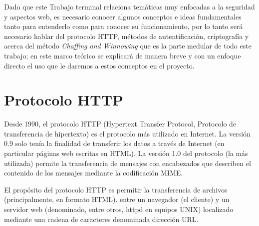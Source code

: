 \documentclass[12pt, a4paper, titlepage]{report}
\begin{document}
	        Dado que este Trabajo terminal relaciona temáticas muy enfocadas a la seguridad y aspectos web, es necesario conocer algunos conceptos e ideas fundamentales tanto para entenderlo como para conocer su funcionamiento, por lo tanto será necesario hablar del protocolo HTTP, métodos de autentificación, criptografía y acerca del método \textit{Chaffing and Winnowing} que es la parte medular de todo este trabajo; en este marco teórico se explicará de manera breve y con un enfoque directo el uso que le daremos a estos conceptos en el proyecto.
	    \section{Protocolo HTTP}
    	    Desde 1990, el protocolo HTTP (Hypertext Transfer Protocol, Protocolo de transferencia de hipertexto) es el protocolo más utilizado en Internet. La versión 0.9 solo tenía la finalidad de transferir los datos a través de Internet (en particular páginas web escritas en HTML). La versión 1.0 del protocolo (la más utilizada) permite la transferencia de mensajes con encabezados que describen el contenido de los mensajes mediante la codificación MIME.

            El propósito del protocolo HTTP es permitir la transferencia de archivos (principalmente, en formato HTML). entre un navegador (el cliente) y un servidor web (denominado, entre otros, httpd en equipos UNIX) localizado mediante una cadena de caracteres denominada dirección URL. \cite{protocoloHTTP}
            
\end{document}
